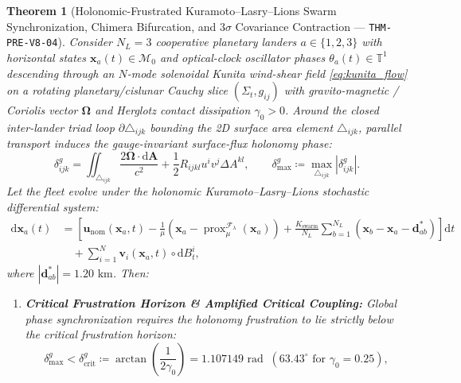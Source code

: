 \documentclass[11pt,a4paper,reqno]{article}
\theoremstyle{plain}
\newtheorem{theorem}{Theorem}[section]
\theoremstyle{definition}
\theoremstyle{remark}
\numberwithin{equation}{section}
\begin{document}
\begin{theorem}[{Holonomic-Frustrated Kuramoto--Lasry--Lions Swarm Synchronization, Chimera Bifurcation, and $3\sigma$ Covariance Contraction --- \texttt{THM-PRE-V8-04}}]\label{thm:swarm_edl_dispersion}
Consider $N_L = 3$ cooperative planetary landers $a \in \{1, 2, 3\}$ with horizontal states $\mathbf{x}_a(t) \in \mathcal{M}_0$ and optical-clock oscillator phases $\theta_a(t) \in \mathbb{T}^1$ descending through an $N$-mode solenoidal Kunita wind-shear field \eqref{eq:kunita_flow} on a rotating planetary/cislunar Cauchy slice $(\Sigma_t, g_{ij})$ with gravito-magnetic / Coriolis vector $\bm{\Omega}$ and Herglotz contact dissipation $\gamma_0 > 0$. Around the closed inter-lander triad loop $\partial\triangle_{ijk}$ bounding the 2D surface area element $\triangle_{ijk}$, parallel transport induces the gauge-invariant surface-flux holonomy phase:
\begin{equation}\label{eq:sagnac_surface_flux_spde_v4}
  \delta_{ijk}^g = \iint_{\triangle_{ijk}} \frac{2\bm{\Omega} \cdot \mathrm{d}\mathbf{A}}{c^2} + \frac{1}{2} R_{ijkl} u^i v^j \Delta A^{kl}, \qquad \delta_{\max}^g \coloneqq \max_{\triangle_{ijk}} |\delta_{ijk}^g|.
\end{equation}
Let the fleet evolve under the holonomic Kuramoto--Lasry--Lions stochastic differential system:
\begin{align}\label{eq:swarm_edl_sde}
  \mathrm{d}\mathbf{x}_a(t) &= \left[ \mathbf{u}_{\mathrm{nom}}(\mathbf{x}_a, t) - \frac{1}{\mu}\!\left(\mathbf{x}_a - \operatorname{prox}_\mu^{\mathcal{F}_\lambda}(\mathbf{x}_a)\right) + \frac{K_{\mathrm{swarm}}}{N_L}\sum_{b=1}^{N_L} \left( \mathbf{x}_b - \mathbf{x}_a - \mathbf{d}_{ab}^* \right) \right]\mathrm{d}t \nonumber \\
  &\quad + \sum_{i=1}^N \mathbf{v}_i(\mathbf{x}_a, t) \circ \mathrm{d}B_t^i,
\end{align}
where $|\mathbf{d}_{ab}^*| = 1.20\text{ km}$. Then:
\begin{enumerate}[label=\textbf{(\arabic*)}, leftmargin=2.0em]
  \item \textbf{Critical Frustration Horizon \& Amplified Critical Coupling:} Global phase synchronization requires the holonomy frustration to lie strictly below the critical frustration horizon:
  \begin{equation}\label{eq:critical_frustration_spde_v4}
    \delta_{\max}^g < \delta_{\mathrm{crit}}^g \coloneqq \arctan\!\left(\frac{1}{2\gamma_0}\right) = 1.107149\text{ rad} \;\; (63.43^\circ \text{ for } \gamma_0 = 0.25),
  \end{equation}

\end{enumerate}
\end{theorem}
\end{document}
